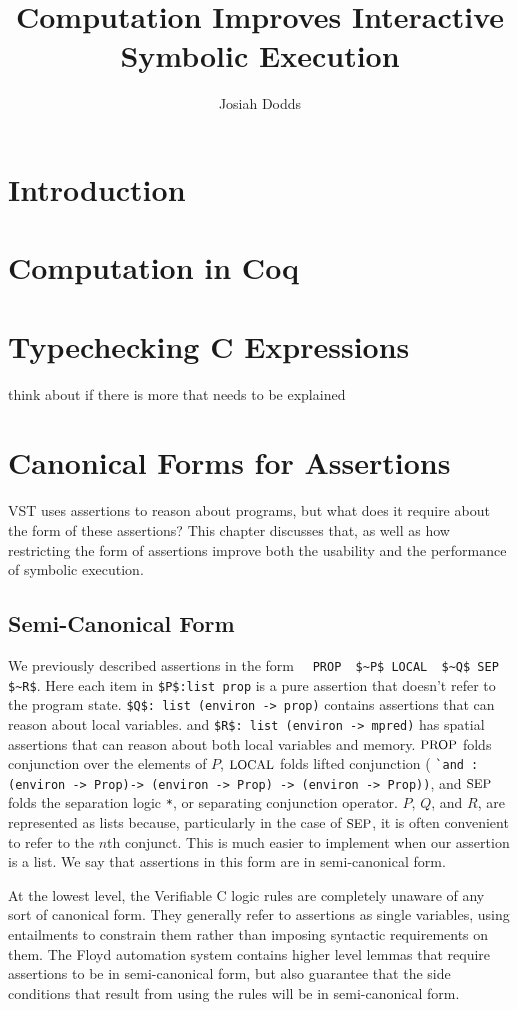 \documentclass{puthesis}
\author{Josiah Dodds}
\title{Computation Improves Interactive Symbolic Execution}
\begin{document}
\chapter{Introduction}

\chapter{Computation in Coq}

\chapter{Typechecking C Expressions}
think about if there is more that needs to be explained

\chapter{Canonical Forms for Assertions}

VST uses assertions to reason about programs, but what does 
it require about the form of these assertions? This chapter
discusses that, as well as how restricting the form of
assertions improve both the usability and the performance
of symbolic execution.

\section{Semi-Canonical Form}

We previously described \cite{appel14:plcc} assertions in the form
~~\lstinline{PROP  $~P$ LOCAL  $~Q$ SEP  $~R$}. 
Here each item in \lstinline|$P$:list prop| is a pure assertion that 
doesn't refer to the program state. \lstinline|$Q$: list (environ -> prop)|
contains assertions that can reason about local variables. 
and \lstinline|$R$: list (environ -> mpred)| has spatial assertions that
can reason about both local variables and memory. 
$\mbox{\small PROP}$ folds conjunction over the elements of $P$, $\mbox{\small LOCAL}$
folds lifted conjunction (
\lstinline|`and : (environ -> Prop)-> (environ -> Prop) -> (environ -> Prop))|,
and $\mbox{\small SEP}$ folds the separation logic \lstinline|*|, or separating conjunction
operator. $P$, $Q$, and $R$, are represented as lists because, particularly 
in the case of $\mbox{\small SEP}$, it is often convenient to refer to the $n$th 
conjunct. This is much easier to implement when our assertion is a list. 
We say that assertions in this form are in semi-canonical form. 

At the lowest level, the Verifiable C 
logic rules are completely unaware of any
sort of canonical form. They generally refer to assertions as single
variables, using entailments to constrain them rather than imposing
syntactic requirements on them. The Floyd automation system contains
higher level lemmas that require assertions to be in semi-canonical
form, but also guarantee that the side conditions that result from
using the rules will be in semi-canonical form. 
\end{document}
